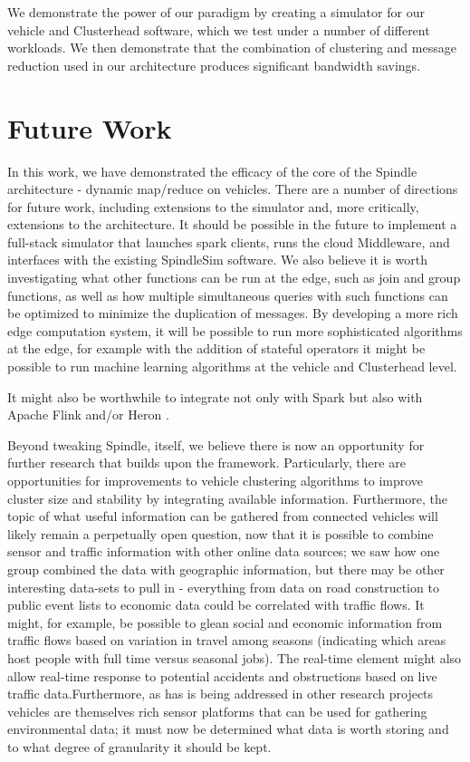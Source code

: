 \documentclass{thesis}
\begin{document}
    We demonstrate the power of our paradigm by creating a simulator for our vehicle and Clusterhead software,
    which we test under a number of different workloads. We then demonstrate that the combination of clustering
    and message reduction used in our architecture produces significant bandwidth savings.

\section{Future Work}
    In this work, we have demonstrated the efficacy of the core of the Spindle architecture - dynamic map/reduce
    on vehicles. There are a number of directions for future work, including extensions to the simulator and, 
    more critically, extensions to the architecture.
    It should be possible in the future to implement a full-stack simulator that launches spark clients, runs
    the cloud Middleware, and interfaces with the existing SpindleSim software. We also believe it is worth
    investigating what other functions can be run at the edge, such as join and group functions, as well
    as how multiple simultaneous queries with such functions can be optimized to minimize the duplication
    of messages. By developing a more rich edge computation system, it will be possible to run more sophisticated
    algorithms at the edge, for example with the addition of stateful operators it might be possible to run
    machine learning algorithms at the vehicle and Clusterhead level.

    It might also be worthwhile to integrate not only with Spark but also with Apache Flink \cite{flink}
    and/or Heron \cite{heron}.

    Beyond tweaking Spindle, itself, we believe there is now an opportunity for further research that builds
    upon the framework. Particularly, there are opportunities for improvements to vehicle clustering algorithms
    to improve cluster size and stability by integrating available information. Furthermore, the topic of what
    useful information can be gathered from connected vehicles will likely remain a perpetually open question,
    now that it is possible to combine sensor and traffic information with other online data sources; we saw
    how one group combined the data with geographic information, but there may be other interesting data-sets
    to pull in - everything from data on road construction to public event lists to economic data could be
    correlated with traffic flows. It might, for example, be possible to glean social and economic information
    from traffic flows based on variation in travel among seasons (indicating which areas host people with full
    time versus seasonal jobs). The real-time element might also allow real-time response to potential accidents
    and obstructions based on live traffic data.Furthermore, as has is being addressed in other research projects %
    vehicles are themselves rich sensor platforms that can be used for gathering environmental data; it must
    now be determined what data is worth storing and to what degree of granularity it should be kept.


\begin{singlespace}


\end{singlespace}
\end{document}
